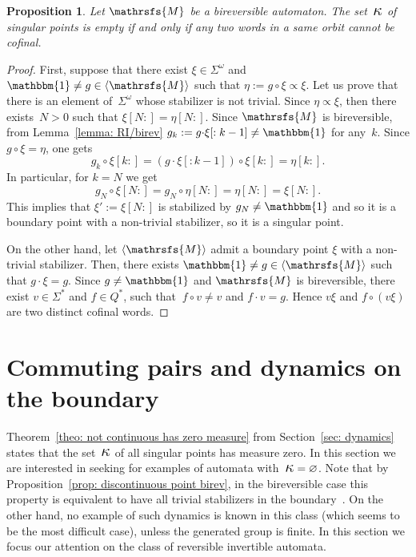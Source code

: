 \documentclass{amsart}
\newtheorem{proposition}[theorem]{Proposition}
\begin{document}
\begin{proposition}
Let ${{{\mathrsfs{{M}}}}}$ be a bireversible automaton.
The set~${\hbox{\Large{$\kappa$}}}$ of singular points is empty if and only if any two words in a same orbit cannot be cofinal.
\end{proposition}

\begin{proof}
First, suppose that there exist $\xi\in {{{\Sigma}}}^{\omega}$ and $\operatorname{\mathbbm{1}} \neq g\in {{{\langle}{{\mathrsfs{{{M}}}}}{\rangle}}}$ such that $\eta:=g{{{\circ}}} \xi{\mathrel{\propto}}\xi$. Let us prove that there is an element of~${{{\Sigma}}}^{\omega}$ whose stabilizer is not trivial. Since $\eta{\mathrel{\propto}}\xi$, then there exists~$N>0$ such that $\xi[N:]=\eta[N:]$. Since ${{{\mathrsfs{{M}}}}}$ is bireversible, from Lemma~\ref{lemma: RI/birev} $g_k:=g{{{\cdot}}} \xi[:k-1]\neq \operatorname{\mathbbm{1}}$ for any~$k$. Since $g{{{\circ}}} \xi = \eta$, one gets
$$
g_k{{{\circ}}} \xi[k:] = (g{{{\cdot}}} \xi[:k-1]) {{{\circ}}} \xi[k:] =  \eta[k:].
$$
In particular, for $k=N$ we get
$$
g_N{{{\circ}}} \xi[N:] =g_N{{{\circ}}} \eta[N:]= \eta[N:] = \xi[N:].
$$
This implies that $\xi':= \xi[N:]$ is stabilized by $g_N\neq \operatorname{\mathbbm{1}}$ and so it is a boundary point with a non-trivial stabilizer, so it is a singular point.

On the other hand, let ${{{\langle}{{\mathrsfs{{{M}}}}}{\rangle}}}$ admit a boundary point $\xi$ with a non-trivial stabilizer. Then, there exists $\operatorname{\mathbbm{1}}\neq g\in {{{\langle}{{\mathrsfs{{{M}}}}}{\rangle}}}$ such that $g {{{\cdot}}} \xi = g$. Since $g \neq \operatorname{\mathbbm{1}}$ and ${{{\mathrsfs{{M}}}}}$ is bireversible, there exist $ v \in {{{\Sigma}}}^*$ and $ f \in {{{Q}}}^*$, such that $ \: f{{{\circ}}} v \neq v$ and $  f {{{\cdot}}} v = g$. Hence $v\xi $ and $f{{{\circ}}} (v\xi)$ are two distinct cofinal words.
\end{proof}

\section{Commuting pairs and dynamics on the boundary}\label{sec: tiling comm}

Theorem~\ref{theo: not continuous has zero measure} from Section~\ref{sec: dynamics} states that the set~${\hbox{\Large{$\kappa$}}}$ of all singular points has measure zero. In this section we are interested in seeking for examples of automata with~${\hbox{\Large{$\kappa$}}}=\varnothing$. Note that by
Proposition~\ref{prop: discontinuous point birev}, in the bireversible
case this property is equivalent to have all trivial stabilizers in
the boundary~\cite{GriSa13}. On the other hand, no example of such
dynamics is known in this class (which seems to be the most difficult case), unless the generated group is finite. In this section we focus our attention on the class of reversible invertible automata.
\end{document}

